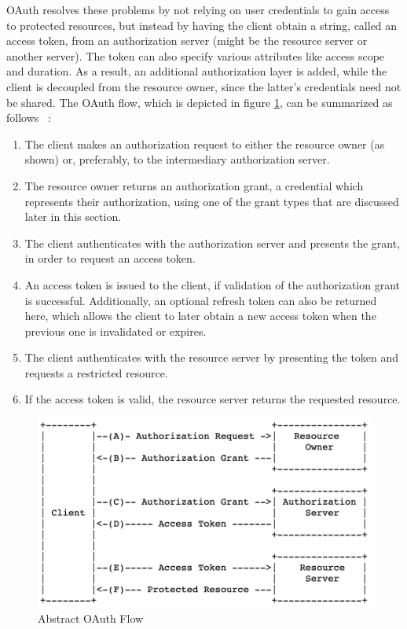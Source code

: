 OAuth resolves these problems by not relying on user credentials to gain access to protected resources, but instead by having the client obtain a string, called an access token, from an authorization server (might be the resource server or another server).  The token can also specify various attributes like access scope and duration. As a result, an additional authorization layer is added, while the client is decoupled from the resource owner, since the latter's credentials need not be shared. The OAuth flow, which is depicted in figure \ref{fig:oauth_flow}, can be summarized as follows ~\cite{oauth}:

\begin{enumerate} [(A.)]
    \item The client makes an authorization request to either the resource owner  (as shown) or, preferably, to the intermediary authorization server.

    \item The resource owner returns an authorization grant, a credential which represents their authorization, using one of the grant types that are discussed later in this section.

    \item The client authenticates with the authorization server and presents the grant, in order to request an access token.

    \item An access token is issued to the client, if validation of the authorization grant is successful. Additionally, an optional refresh token can also be returned here, which allows the client to later obtain a new access token when the previous one is invalidated or expires.

    \item  The client authenticates with the resource server by presenting the token and requests a restricted resource.

    \item If the access token is valid, the resource server returns the requested resource.
\end{enumerate}

\begin{figure} [h]
    \centering
    \includegraphics[scale=0.7]{images/oauth_flow}
    \caption{\label{fig:oauth_flow}Abstract OAuth Flow}
\end{figure}

